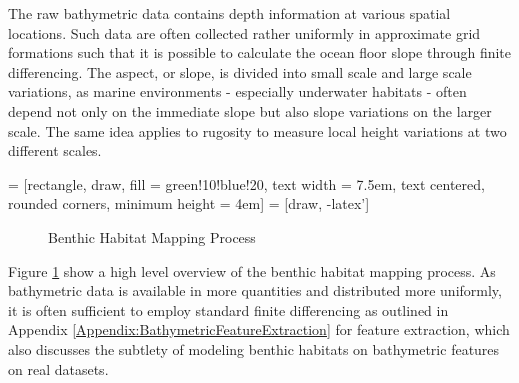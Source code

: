 		The raw bathymetric data contains depth information at various spatial locations. Such data are often collected rather uniformly in approximate grid formations such that it is possible to calculate the ocean floor slope through finite differencing. The aspect, or slope, is divided into small scale and large scale variations, as marine environments - especially underwater habitats - often depend not only on the immediate slope but also slope variations on the larger scale. The same idea applies to rugosity to measure local height variations at two different scales.
		
		 = [rectangle, draw, fill = green!10!blue!20, text width = 7.5em, text centered, rounded corners, minimum height = 4em]
		 = [draw, -latex']
	
		\begin{figure}[!ht]
		\centering{}		
		\caption{Benthic Habitat Mapping Process}
		\label{Figure:BenthicHabitatMappingProcess}
		\end{figure}
		
		Figure \ref{Figure:BenthicHabitatMappingProcess} show a high level overview of the benthic habitat mapping process. As bathymetric data is available in more quantities and distributed more uniformly, it is often sufficient to employ standard finite differencing as outlined in Appendix \ref{Appendix:BathymetricFeatureExtraction} for feature extraction, which also discusses the subtlety of modeling benthic habitats on bathymetric features on real datasets.
		

